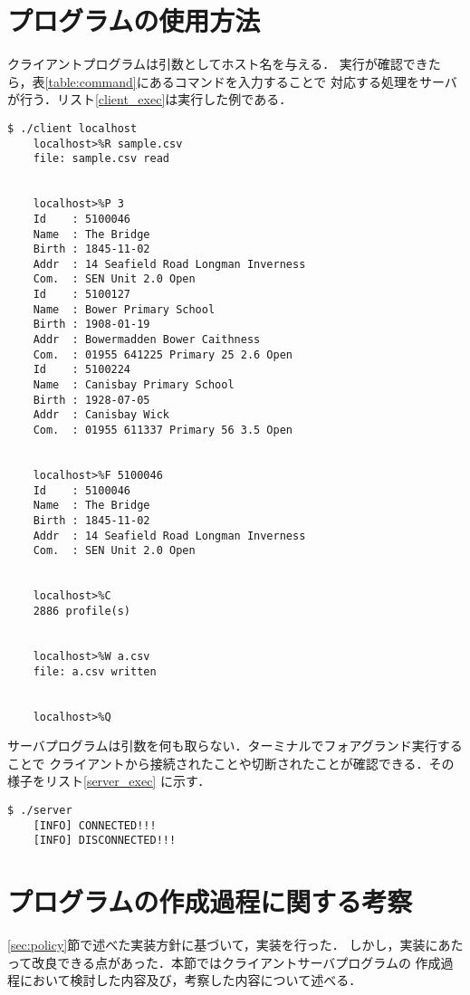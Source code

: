 \documentclass[11pt]{jarticle}
\begin{document}
\section{プログラムの使用方法} \label{sec:usage}

クライアントプログラムは引数としてホスト名を与える．
実行が確認できたら，表\ref{table:command}にあるコマンドを入力することで
対応する処理をサーバが行う．リスト\ref{client_exec}は実行した例である．

\begin{lstlisting}[caption=クライアントプログラム実行例,label=client_exec]
    $ ./client localhost
    localhost>%R sample.csv
    file: sample.csv read


    localhost>%P 3
    Id    : 5100046
    Name  : The Bridge
    Birth : 1845-11-02
    Addr  : 14 Seafield Road Longman Inverness
    Com.  : SEN Unit 2.0 Open
    Id    : 5100127
    Name  : Bower Primary School
    Birth : 1908-01-19
    Addr  : Bowermadden Bower Caithness
    Com.  : 01955 641225 Primary 25 2.6 Open
    Id    : 5100224
    Name  : Canisbay Primary School
    Birth : 1928-07-05
    Addr  : Canisbay Wick
    Com.  : 01955 611337 Primary 56 3.5 Open


    localhost>%F 5100046
    Id    : 5100046
    Name  : The Bridge
    Birth : 1845-11-02
    Addr  : 14 Seafield Road Longman Inverness
    Com.  : SEN Unit 2.0 Open


    localhost>%C
    2886 profile(s)


    localhost>%W a.csv
    file: a.csv written


    localhost>%Q
\end{lstlisting}

サーバプログラムは引数を何も取らない．ターミナルでフォアグランド実行することで
クライアントから接続されたことや切断されたことが確認できる．その様子をリスト\ref{server_exec}
に示す．

\begin{lstlisting}[caption=サーバプログラムの実行例,label=server_exec]
    $ ./server 
    [INFO] CONNECTED!!!
    [INFO] DISCONNECTED!!!
\end{lstlisting}


\section{プログラムの作成過程に関する考察}

\ref{sec:policy}節で述べた実装方針に基づいて，実装を行った．
しかし，実装にあたって改良できる点があった．本節ではクライアントサーバプログラムの
作成過程において検討した内容及び，考察した内容について述べる．
\end{document}
